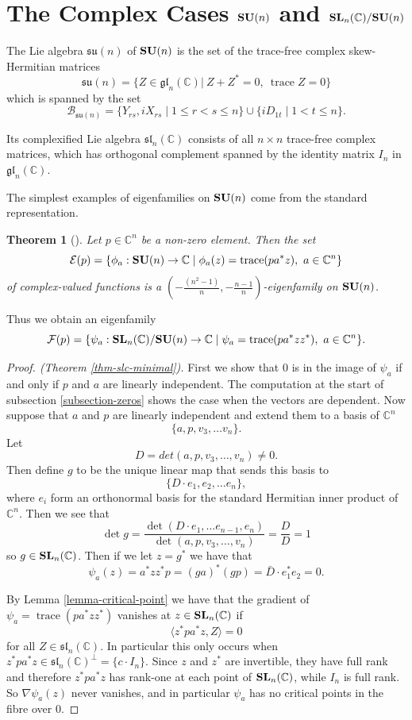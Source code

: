 \documentclass[11pt,reqno]{amsart}
\theoremstyle{plain}
\newtheorem{theorem}                 {Theorem}[section]
\theoremstyle{definition}
\numberwithin{equation}{section}
\def \cn{{\mathbb C}}
\def \B{\mathcal B}
\def \E{\mathcal E}
\def \F{\mathcal F}
\def \glc#1{\mathfrak{gl}_{#1}(\cn)}
\def \SLC#1{\text{\bf SL}_{#1}(\cn)}
\def \slc#1{\mathfrak{sl}_{#1}(\cn)}
\def \SU#1{\text{\bf SU}(#1)}
\def \su#1{\mathfrak{su}(#1)}
\DeclareMathOperator{\trace}{trace}
\numberwithin{equation}{section}
\begin{document}
\section{The Complex Cases $\SU n$ and $\SLC n/\SU n$}
\label{section-complex-cases}

The Lie algebra $\su n$ of $\SU n$ is the set of the trace-free complex skew-Hermitian matrices
$$\su n=\{Z\in\glc n |\ Z+ Z^*=0, \ \trace Z = 0\}$$ 
 which is spanned by the set
$$ \B_{\su{n}} = \{ Y_{rs}, i X_{rs}  \mid 1 \leq r  < s \leq n\} \cup \{ iD_{1t} \mid 1 < t \leq n\}.$$ 

Its complexified Lie algebra $\slc{n}$ consists of all $n \times n$ trace-free complex matrices, which has orthogonal complement spanned by the identity matrix $I_n$ in $\glc{n}$.

The simplest examples of eigenfamilies on $\SU{n}$ come from the standard representation.
\begin{theorem}[\cite{Gud-Sak-1}]
Let $p \in \cn^n$ be a non-zero element. Then the set 
	$$ \E(p) = \{ \phi_a : \SU{n} \to \cn \mid \phi_a(z)= \trace (p a^* z), \ a\in \cn^n \}$$
	of complex-valued functions is a $(-\tfrac{(n^2-1)}{n},-\tfrac{n-1}{n})$-eigenfamily on $\SU{n}$.
	\end{theorem}
	
Thus we obtain an eigenfamily
$$ \F(p) =\{\psi_a : \SLC{n}/\SU{n} \to \cn \mid \psi_a = \trace (p a^* {z} z^*), \ a \in \cn^n\}.$$


\begin{proof}[Proof. (Theorem \ref{thm-slc-minimal})]
	First we show that $0$ is in the image of $\psi_a$ if and only if $p$ and $a$ are linearly independent. The computation at the start of subsection \ref{subsection-zeros} shows the case when the vectors are dependent. Now suppose that $a$ and $p$ are linearly independent and extend them to a basis of $\cn^n$
	$$ \{ a,p,v_3, \dots v_n \}.$$
	Let $$D=det(a,p,v_3,\dots,v_n) \neq 0.$$ 
	Then define $g$ to be the unique linear map that sends this basis to 
	$$ \{ D\cdot e_1, e_2, \dots e_n\},$$
	where $e_i$ form an orthonormal basis for the standard Hermitian inner product of $\cn^n$.
	Then we see that 
	$$ \det g = \frac{\det (D\cdot e_1, \dots e_{n-1},e_n)}{\det(a,p,v_3,\dots,v_n)} = \frac{D}{D} = 1$$
	so $g \in \SLC{n}$. Then if we let $ z = g^*$ we have that
	$$\psi_a(z) = a^* z z^* p = (ga)^* (gp) = \bar D \cdot e_1^* e_2 = 0.$$
	
By Lemma \ref{lemma-critical-point} we have that the gradient of $\psi_a = \trace (p a^* {z} z^{*})$ vanishes at $z \in \SLC{n}$   if
$$ \langle z^* p a^* z, Z \rangle = 0$$
for all $Z \in \slc{n}$. In particular this only occurs when $z^* p a^* z \in \slc{n}^\perp = \{ c \cdot I_n \}$. Since $z$ and $z^*$ are invertible, they have full rank and therefore $z^* p a^* z$ has rank-one at each point of $\SLC{n}$, while $I_n$ is full rank. So $\nabla \psi_a(z)$ never vanishes, and in particular $\psi_a$ has no critical points in the fibre over $0$.
\end{proof}
\end{document}
